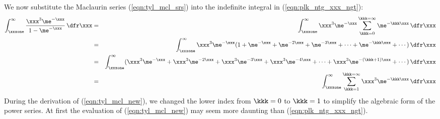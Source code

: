 \documentclass[12pt]{article}
\begin{document}
We now substitute the Maclaurin series (\ref{eqn:tyl_mcl_srs}) into 
the indefinite integral in (\ref{eqn:plk_ntg_xxx_ngt}):
\begin{eqnarray}
\int_{\xxxone}^{\infty} 
\frac{\xxx^{3}\me^{-\xxx}}{1 - \me^{-\xxx}} \,\dfr\xxx
& = &
\int_{\xxxone}^{\infty} \xxx^{3}\me^{-\xxx} \sum_{\kkk=0}^{\kkk=\infty} \me^{-\kkk\xxx} \,\dfr\xxx \nonumber \\
& = &
\int_{\xxxone}^{\infty} \xxx^{3}\me^{-\xxx} ( 1 + \me^{-\xxx} + \me^{-2\xxx} + \me^{-3\xxx} + \cdots + \me^{-\kkk\xxx} + \cdots ) \,\dfr\xxx \nonumber \\
& = &
\int_{\xxxone}^{\infty} ( \xxx^{3}\me^{-\xxx} + \xxx^{3}\me^{-2\xxx} + \xxx^{3}\me^{-3\xxx} + \xxx^{3}\me^{-4\xxx} + \cdots + \xxx^{3}\me^{-(\kkk+1)\xxx} + \cdots ) \,\dfr\xxx \nonumber \\
& = &
\int_{\xxxone}^{\infty} \sum_{\kkk=1}^{\kkk=\infty} \xxx^{3}\me^{-\kkk\xxx} \,\dfr\xxx  
\label{eqn:tyl_mcl_new}
\end{eqnarray}
During the derivation of (\ref{eqn:tyl_mcl_new}), we changed the lower index from 
$\kkk = 0$ to $\kkk = 1$ to simplify the algebraic form of the power series.
At first the evaluation of (\ref{eqn:tyl_mcl_new}) may seem more daunting than
(\ref{eqn:plk_ntg_xxx_ngt}).
\end{document}
